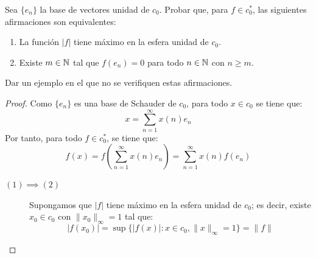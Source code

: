 \begin{ejercicio}
Sea $\{e_n\}$ la base de vectores unidad de $c_0$. Probar que, para $f \in c_0^*$, las siguientes afirmaciones son equivalentes:
\begin{enumerate}
    \item La función $|f|$ tiene máximo en la esfera unidad de $c_0$.
    \item Existe $m \in \mathbb{N}$ tal que $f(e_n) = 0$ para todo $n \in \mathbb{N}$ con $n \geq m$.
\end{enumerate}
Dar un ejemplo en el que no se verifiquen estas afirmaciones.
\begin{proof}
    Como $\{e_n\}$ es una base de Schauder de $c_0$, para todo $x \in c_0$ se tiene que:
    \begin{equation*}
        x = \sum_{n=1}^{\infty} x(n) e_n
    \end{equation*}
    Por tanto, para todo $f \in c_0^*$, se tiene que:
    \begin{equation*}
        f(x) = f\left(\sum_{n=1}^{\infty} x(n) e_n\right) = \sum_{n=1}^{\infty} x(n) f(e_n)
    \end{equation*}

    \begin{description}

        \item[$(1) \implies (2)$] Supongamos que $|f|$ tiene máximo en la esfera unidad de $c_0$; es decir, existe $x_0 \in c_0$ con $\|x_0\|_\infty = 1$ tal que:
        \begin{equation*}
            |f(x_0)| = \sup\{|f(x)| : x \in c_0, \|x\|_\infty = 1\} = \|f\|
        \end{equation*}


\end{description}
\end{proof}
\end{ejercicio}
